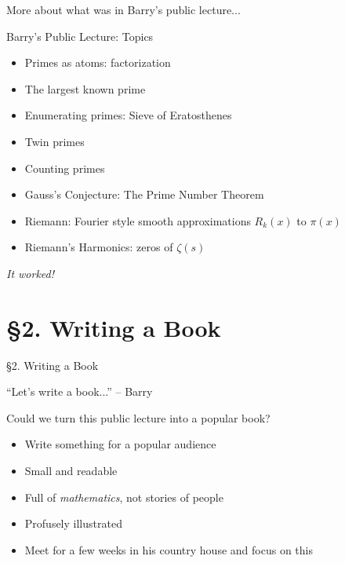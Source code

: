 \documentclass{beamer}
\newcommand{\mysection}[2]{\section{\S#1. #2}%
\begin{frame}{}
\vfill
\begin{center}
\hrulefill
\vfill
\Huge\sc \S#1. #2
\vfill
\hrulefill
\end{center}
\vfill
\end{frame}}
\begin{document}
\begin{frame}{More about what was in Barry's public lecture...}
  \begin{block}{Barry's Public Lecture: Topics}
    \begin{itemize}
      \item Primes as atoms: factorization
      \item The largest known prime
      \item Enumerating primes: Sieve of Eratosthenes
      \item Twin primes
      \item Counting primes
      \item Gauss's Conjecture: The Prime Number Theorem
      \item Riemann: Fourier style smooth approximations $R_k(x)$ to $\pi(x)$
      \item Riemann's Harmonics: zeros of $\zeta(s)$
    \end{itemize}

  \end{block}

  \vfill
  \begin{center}
  \Large
  \emph{It worked!}
\end{center}



\end{frame}

\mysection{2}{Writing a Book}

\begin{frame}{``Let's write a book...'' -- Barry}
  \begin{block}{Could we turn this public lecture into a popular book?}

    \begin{itemize}
      \item Write something for a popular audience
      \item Small and readable
      \item Full of {\em mathematics}, not stories of people
      \item Profusely illustrated
      \item Meet for a few weeks in his country house and focus on this
    \end{itemize}
  \end{block}
\end{frame}
\end{document}
